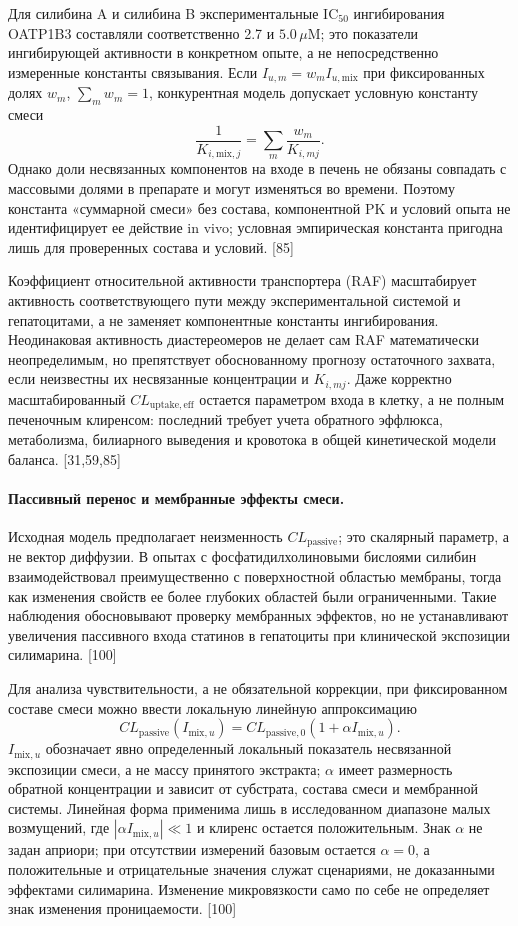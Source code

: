 \documentclass[11pt]{article}
\begin{document}
Для силибина A и силибина B экспериментальные \(\mathrm{IC}_{50}\) ингибирования OATP1B3 составляли соответственно 2.7 и \(5.0\,\mu\mathrm{M}\); это показатели ингибирующей активности в конкретном опыте, а не непосредственно измеренные константы связывания. Если \(I_{u,m}=w_m I_{u,\mathrm{mix}}\) при фиксированных долях \(w_m\), \(\sum_m w_m=1\), конкурентная модель допускает условную константу смеси
\[
\frac{1}{K_{i,\mathrm{mix},j}}=
\sum_m\frac{w_m}{K_{i,mj}}.
\]
Однако доли несвязанных компонентов на входе в печень не обязаны совпадать с массовыми долями в препарате и могут изменяться во времени. Поэтому константа «суммарной смеси» без состава, компонентной PK и условий опыта не идентифицирует ее действие in vivo; условная эмпирическая константа пригодна лишь для проверенных состава и условий. [85]

Коэффициент относительной активности транспортера (RAF) масштабирует активность соответствующего пути между экспериментальной системой и гепатоцитами, а не заменяет компонентные константы ингибирования. Неодинаковая активность диастереомеров не делает сам RAF математически неопределимым, но препятствует обоснованному прогнозу остаточного захвата, если неизвестны их несвязанные концентрации и \(K_{i,mj}\). Даже корректно масштабированный \(CL_{\mathrm{uptake,eff}}\) остается параметром входа в клетку, а не полным печеночным клиренсом: последний требует учета обратного эффлюкса, метаболизма, билиарного выведения и кровотока в общей кинетической модели баланса. [31,59,85]

\paragraph{Пассивный перенос и мембранные эффекты смеси.}
Исходная модель предполагает неизменность \(CL_{\mathrm{passive}}\); это скалярный параметр, а не вектор диффузии. В опытах с фосфатидилхолиновыми бислоями силибин взаимодействовал преимущественно с поверхностной областью мембраны, тогда как изменения свойств ее более глубоких областей были ограниченными. Такие наблюдения обосновывают проверку мембранных эффектов, но не устанавливают увеличения пассивного входа статинов в гепатоциты при клинической экспозиции силимарина. [100]

Для анализа чувствительности, а не обязательной коррекции, при фиксированном составе смеси можно ввести локальную линейную аппроксимацию
\[
CL_{\mathrm{passive}}(I_{\mathrm{mix},u})=
CL_{\mathrm{passive},0}\left(1+\alpha I_{\mathrm{mix},u}\right).
\]
\(I_{\mathrm{mix},u}\) обозначает явно определенный локальный показатель несвязанной экспозиции смеси, а не массу принятого экстракта; \(\alpha\) имеет размерность обратной концентрации и зависит от субстрата, состава смеси и мембранной системы. Линейная форма применима лишь в исследованном диапазоне малых возмущений, где \(|\alpha I_{\mathrm{mix},u}|\ll1\) и клиренс остается положительным. Знак \(\alpha\) не задан априори; при отсутствии измерений базовым остается \(\alpha=0\), а положительные и отрицательные значения служат сценариями, не доказанными эффектами силимарина. Изменение микровязкости само по себе не определяет знак изменения проницаемости. [100]
\end{document}
